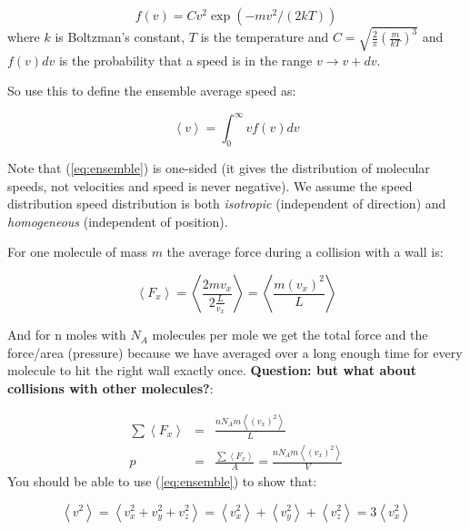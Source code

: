 \documentclass[12pt]{article}
\begin{document}
\begin{equation}
  \label{eq:maxwell}
  f(v) = C  v^2 \exp(-m v^2 /(2 k T))
\end{equation}
where $k$ is Boltzman's constant, $T$ is the temperature and $C=\sqrt{\frac{2}{\pi}\left(\frac{m}{kT}\right)^3}$
and $f(v)dv$ is the probability that a speed is in the range
$v \rightarrow v + dv$.

So use this to define the ensemble average speed as:

\begin{equation}
  \label{eq:ensemble}
  \left < v \right > = \int_0^\infty v f(v) dv
\end{equation}

Note that
(\ref{eq:ensemble}) is one-sided (it gives the distribution of molecular speeds,
not velocities and speed is never negative).  We assume the speed distribution
speed distribution is both \textit{isotropic} (independent of direction) and
\textit{homogeneous} (independent of position).

For one molecule of mass $m$ the average force during a collision with a wall is:

\begin{equation}
  \label{eq:avg}
    \left < F_x \right > = \left < \frac{2 m v_x}{2\frac{L}{v_x}} \right > 
                = \left < \frac{m(v_x)^2}{L} \right > 
\end{equation}

And for n moles with $N_A$ molecules per mole we get the total force and
the force/area (pressure) because we have averaged over a long enough time
for every molecule to hit the right wall exactly once.  \textbf{Question:
but what about collisions with other molecules?}:

\begin{subequations}
\begin{eqnarray}
  \label{eq:rms}
  \sum \left < F_x \right > &=& \frac{n N_A m \left < (v_x)^2 \right >}{L} \\
  p &=& \frac{\sum \left < F_x \right > }{A} = \frac{nN_A m \left < (v_x)^2 \right >}{V}\label{eq:press1}
\end{eqnarray}
\end{subequations}
You should be able to use  (\ref{eq:ensemble}) to show that:

\begin{equation}
  \label{eq:3comp}
  \left < v^2 \right > =   \left < v_x^2 + v_y^2 + v_z^2 \right > = 
    \left < v_x^2 \right >  +  \left < v_y^2 \right > + \left < v_z^2 \right > = 3 \left < v_x^2 \right >
\end{equation}
\end{document}
